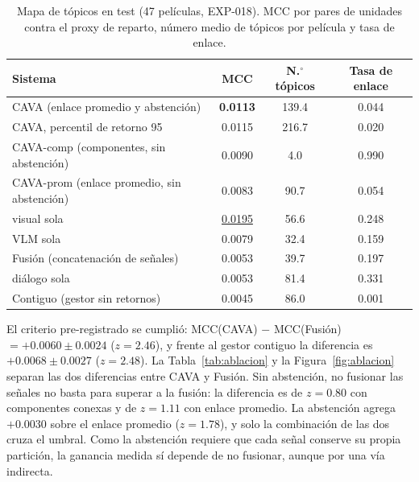 \begin{table}[H]
    \centering
    \caption{Mapa de tópicos en test (47 películas, EXP-018). MCC por pares de unidades
    contra el proxy de reparto, número medio de tópicos por película y tasa de enlace.}
    \label{tab:exp018}
    \small
    \begin{tabular}{lccc}
        \hline
        \textbf{Sistema} & \textbf{MCC} & \textbf{N.$^{\circ}$ tópicos} & \textbf{Tasa de enlace} \\
        \hline
        CAVA (enlace promedio y abstención) & \textbf{0.0113} & 139.4 & 0.044 \\
        CAVA, percentil de retorno 95 & 0.0115 & 216.7 & 0.020 \\
        CAVA-comp (componentes, sin abstención) & 0.0090 & 4.0 & 0.990 \\
        CAVA-prom (enlace promedio, sin abstención) & 0.0083 & 90.7 & 0.054 \\
        visual sola & \underline{0.0195} & 56.6 & 0.248 \\
        VLM sola & 0.0079 & 32.4 & 0.159 \\
        Fusión (concatenación de señales) & 0.0053 & 39.7 & 0.197 \\
        diálogo sola & 0.0053 & 81.4 & 0.331 \\
        Contiguo (gestor sin retornos) & 0.0045 & 86.0 & 0.001 \\
        \hline
    \end{tabular}
\end{table}

El criterio pre-registrado se cumplió: MCC(CAVA) $-$ MCC(Fusión)
$= +0.0060 \pm 0.0024$ ($z = 2.46$), y frente al gestor contiguo la diferencia es $+0.0068
\pm 0.0027$ ($z = 2.48$). La Tabla~\ref{tab:ablacion} y la Figura~\ref{fig:ablacion}
separan las dos diferencias entre CAVA y Fusión. Sin abstención, no
fusionar las señales no basta para superar a la fusión: la diferencia es de $z = 0.80$ con
componentes conexas y de $z = 1.11$ con enlace promedio. La abstención agrega $+0.0030$
sobre el enlace promedio ($z = 1.78$), y solo la combinación de las dos cruza el umbral. Como
la abstención requiere que cada señal conserve su propia partición, la ganancia medida sí
depende de no fusionar, aunque por una vía indirecta.

